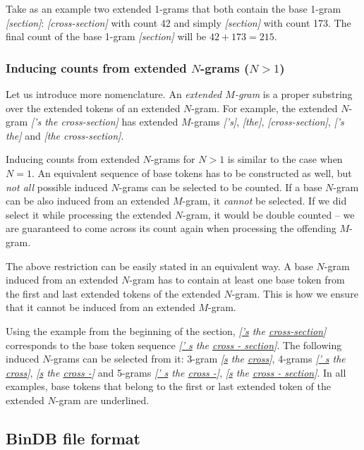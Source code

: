 \documentclass[draft]{IIBproject}
\DeclareRobustCommand{\ngram}[1]{\emph{[#1]}}
\begin{document}
Take as an example two extended 1-grams that both contain the base 1-gram \ngram{section}: \ngram{cross-section} with count 42 and simply \ngram{section} with count 173. The final count of the base 1-gram \ngram{section} will be $42+173=215$.

\subsubsection{Inducing counts from extended $N$-grams ($N > 1$)}

Let us introduce more nomenclature. An \emph{extended $M$-gram} is a proper substring over the extended tokens of an extended $N$-gram. For example, the extended $N$-gram \ngram{'s the \mbox{cross-section}} has extended $M$-grams \ngram{'s}, \ngram{the}, \ngram{\mbox{cross-section}}, \ngram{'s the} and \ngram{the \mbox{cross-section}}.

Inducing counts from extended $N$-grams for $N>1$ is similar to the case when $N=1$. An equivalent sequence of base tokens has to be constructed as well, but \emph{not all} possible induced $N$-grams can be selected to be counted. If a base $N$-gram can be also induced from an extended $M$-gram, it \emph{cannot} be selected. If we did select it while processing the extended $N$-gram, it would be double counted -- we are guaranteed to come across its count again when processing the offending $M$-gram.

The above restriction can be easily stated in an equivalent way. A base $N$-gram induced from an extended $N$-gram has to contain at least one base token from the first and last extended tokens of the extended $N$-gram. This is how we ensure that it cannot be induced from an extended $M$-gram.

Using the example from the beginning of the section, \ngram{\underline{'s} the \mbox{\underline{cross-section}}} corresponds to the base token sequence \ngram{\underline{' s} the \underline{cross - section}}. The following induced $N$-grams can be selected from it: 3-gram \ngram{\underline{s} the \underline{cross}}, 4-grams \ngram{\underline{' s} the \underline{cross}}, \ngram{\underline{s} the \underline{cross -}} and 5-grams \ngram{\underline{' s} the \underline{cross -}}, \ngram{\underline{s} the \underline{cross - section}}. In all examples, base tokens that belong to the first or last extended token of the extended $N$-gram are underlined.

\FloatBarrier
\subsection{BinDB file format}
\end{document}
